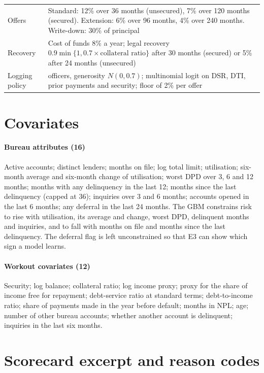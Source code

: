 \documentclass[10pt]{article}
\begin{document}
\begin{table}[H]
\begin{tabularx}{\textwidth}{>{\raggedright\arraybackslash}p{3.4cm} >{\raggedright\arraybackslash}X}
Offers & Standard: 12\% over 36 months (unsecured), 7\% over 120 months (secured). Extension: 6\% over 96 months, 4\% over 240 months. Write-down: 30\% of principal \\
Recovery & Cost of funds 8\% a year; legal recovery $0.9\min\{1, 0.7\times\text{collateral ratio}\}$ after 30 months (secured) or 5\% after 24 months (unsecured) \\
Logging policy & 60 officers, generosity $N(0, 0.7)$; multinomial logit on DSR, DTI, prior payments and security; floor of 2\% per offer \\
\bottomrule
\end{tabularx}
\end{table}

\section{Covariates}\label{app:features}

\paragraph{Bureau attributes (16)} Active accounts; distinct lenders; months on file; log total limit; utilisation; six-month average and six-month change of utilisation; worst DPD over 3, 6 and 12 months; months with any delinquency in the last 12; months since the last delinquency (capped at 36); inquiries over 3 and 6 months; accounts opened in the last 6 months; any deferral in the last 24 months. The GBM constrains risk to rise with utilisation, its average and change, worst DPD, delinquent months and inquiries, and to fall with months on file and months since the last delinquency. The deferral flag is left unconstrained so that E3 can show which sign a model learns.

\paragraph{Workout covariates (12)} Security; log balance; collateral ratio; log income proxy; proxy for the share of income free for repayment; debt-service ratio at standard terms; debt-to-income ratio; share of payments made in the year before default; months in NPL; age; number of other bureau accounts; whether another account is delinquent; inquiries in the last six months.

\section{Scorecard excerpt and reason codes}\label{app:scorecard}
\end{document}
